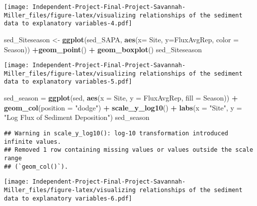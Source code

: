 \documentclass[
]{article}
\newenvironment{Shaded}{\begin{snugshade}}{\end{snugshade}}
\newcommand{\AttributeTok}[1]{\textcolor[rgb]{0.13,0.29,0.53}{#1}}
\newcommand{\FunctionTok}[1]{\textcolor[rgb]{0.13,0.29,0.53}{\textbf{#1}}}
\newcommand{\NormalTok}[1]{#1}
\newcommand{\OtherTok}[1]{\textcolor[rgb]{0.56,0.35,0.01}{#1}}
\newcommand{\SpecialCharTok}[1]{\textcolor[rgb]{0.81,0.36,0.00}{\textbf{#1}}}
\newcommand{\StringTok}[1]{\textcolor[rgb]{0.31,0.60,0.02}{#1}}
\begin{document}
\texttt{[image: Independent-Project-Final-Project-Savannah-Miller\_files/figure-latex/visualizing relationships of the sediment data to explanatory variables-4.pdf]}

\begin{Shaded}
\begin{Highlighting}[]
\NormalTok{sed\_Siteseason }\OtherTok{\textless{}{-}} \FunctionTok{ggplot}\NormalTok{(sed\_SAPA, }\FunctionTok{aes}\NormalTok{(}\AttributeTok{x=}\NormalTok{ Site, }\AttributeTok{y=}\NormalTok{FluxAvgRep, }\AttributeTok{color =}\NormalTok{ Season)) }\SpecialCharTok{+}\FunctionTok{geom\_point}\NormalTok{() }\SpecialCharTok{+} \FunctionTok{geom\_boxplot}\NormalTok{()}
\NormalTok{sed\_Siteseason}
\end{Highlighting}
\end{Shaded}

\texttt{[image: Independent-Project-Final-Project-Savannah-Miller\_files/figure-latex/visualizing relationships of the sediment data to explanatory variables-5.pdf]}

\begin{Shaded}
\begin{Highlighting}[]
\NormalTok{sed\_season }\OtherTok{=} \FunctionTok{ggplot}\NormalTok{(sed, }\FunctionTok{aes}\NormalTok{(}\AttributeTok{x =}\NormalTok{ Site, }\AttributeTok{y =}\NormalTok{ FluxAvgRep, }\AttributeTok{fill =}\NormalTok{ Season)) }\SpecialCharTok{+} 
  \FunctionTok{geom\_col}\NormalTok{(}\AttributeTok{position =} \StringTok{"dodge"}\NormalTok{) }\SpecialCharTok{+}
  \FunctionTok{scale\_y\_log10}\NormalTok{() }\SpecialCharTok{+}
  \FunctionTok{labs}\NormalTok{(}\AttributeTok{x =} \StringTok{"Site"}\NormalTok{, }\AttributeTok{y =} \StringTok{"Log Flux of Sediment Deposition"}\NormalTok{) }
\NormalTok{sed\_season}
\end{Highlighting}
\end{Shaded}

\begin{verbatim}
## Warning in scale_y_log10(): log-10 transformation introduced infinite values.
## Removed 1 row containing missing values or values outside the scale range
## (`geom_col()`).
\end{verbatim}

\texttt{[image: Independent-Project-Final-Project-Savannah-Miller\_files/figure-latex/visualizing relationships of the sediment data to explanatory variables-6.pdf]}
\end{document}
